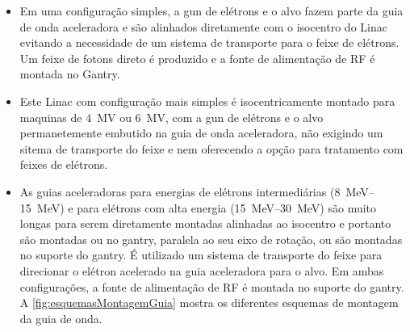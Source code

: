 \documentclass[11pt,a4paper]{article}
\begin{document}
            \begin{itemize}
                \item Em uma configuração simples, a gun de elétrons e o alvo fazem parte da guia de onda aceleradora e são alinhados diretamente com o isocentro do Linac evitando a necessidade de um sistema de transporte para o feixe de elétrons. Um feixe de fotons direto é produzido e a fonte de alimentação de RF é montada no Gantry.
                
                \item Este Linac com configuração mais simples é isocentricamente montado para maquinas de \qty{4}{MV} ou \qty{6}{MV}, com a gun de elétrons e o alvo permanetemente embutido na guia de onda aceleradora, não exigindo um sitema de transporte do feixe e nem oferecendo a opção para tratamento com feixes de elétrons.
                
                \item As guias aceleradoras para energias de elétrons intermediárias (\qtyrange{8}{15}{MeV}) e para elétrons com alta energia (\qtyrange{15}{30}{MeV}) são muito longas para serem diretamente montadas alinhadas ao isocentro e portanto são montadas ou no gantry, paralela ao seu eixo de rotação, ou são montadas no suporte do gantry. É utilizado um sistema de transporte do feixe para direcionar o elétron acelerado na guia aceleradora para o alvo. Em ambas configurações, a fonte de alimentação de RF é montada no suporte do gantry. A \ref{fig:esquemasMontagemGuia} mostra os diferentes esquemas de montagem da guia de onda.
            \end{itemize}
             
\end{document}
